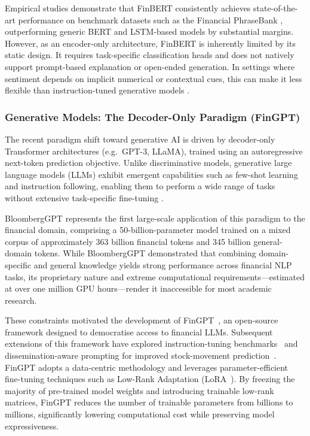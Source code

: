 \documentclass[12pt]{ucetd}
\begin{document}
Empirical studies demonstrate that FinBERT consistently achieves state-of-the-art performance on benchmark datasets such as the Financial PhraseBank \cite{malo2014gooddebt}, outperforming generic BERT and LSTM-based models by substantial margins. However, as an encoder-only architecture, FinBERT is inherently limited by its static design. It requires task-specific classification heads and does not natively support prompt-based explanation or open-ended generation. In settings where sentiment depends on implicit numerical or contextual cues, this can make it less flexible than instruction-tuned generative models \cite{wu2023bloomberggpt, yang2023fingpt}.

\subsubsection{Generative Models: The Decoder-Only Paradigm (FinGPT)}

The recent paradigm shift toward generative AI is driven by decoder-only Transformer architectures (e.g.\ GPT-3, LLaMA), trained using an autoregressive next-token prediction objective. Unlike discriminative models, generative large language models (LLMs) exhibit emergent capabilities such as few-shot learning and instruction following, enabling them to perform a wide range of tasks without extensive task-specific fine-tuning \cite{wu2023bloomberggpt, yang2023fingpt}.

BloombergGPT \cite{wu2023bloomberggpt} represents the first large-scale application of this paradigm to the financial domain, comprising a 50-billion-parameter model trained on a mixed corpus of approximately 363 billion financial tokens and 345 billion general-domain tokens. While BloombergGPT demonstrated that combining domain-specific and general knowledge yields strong performance across financial NLP tasks, its proprietary nature and extreme computational requirements---estimated at over one million GPU hours---render it inaccessible for most academic research.

These constraints motivated the development of FinGPT~\cite{yang2023fingpt}, an open-source framework designed to democratise access to financial LLMs. Subsequent extensions of this framework have explored instruction-tuning benchmarks~\cite{wang2023fingptbenchmark} and dissemination-aware prompting for improved stock-movement prediction~\cite{liang2025fingpt}. FinGPT adopts a data-centric methodology and leverages parameter-efficient fine-tuning techniques such as Low-Rank Adaptation (LoRA~\cite{hu2022lora}). By freezing the majority of pre-trained model weights and introducing trainable low-rank matrices, FinGPT reduces the number of trainable parameters from billions to millions, significantly lowering computational cost while preserving model expressiveness.
\end{document}
